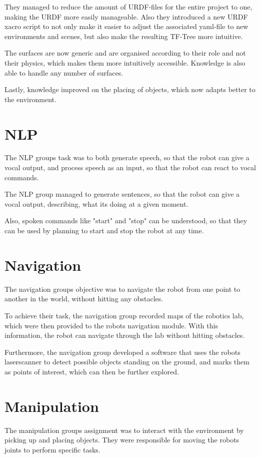\documentclass[main.tex]{subfiles}
\begin{document}
		They managed to reduce the amount of URDF-files for the entire project to one, making the URDF more easily manageable.  Also they introduced a new URDF xacro script to not only make it easier to adjust the associated yaml-file to new environments and scenes, but also make the resulting TF-Tree more intuitive.
		
		The surfaces are now generic and are organised according to their role and not their physics, which makes them more intuitively accessible. Knowledge is also able to handle any number of surfaces.
		
		Lastly, knowledge improved on the placing of objects, which now adapts better to the environment. 		
		\section{NLP}
		The NLP groups task was to both generate speech, so that the robot can give a vocal output, and process speech as an input, so that the robot can react to vocal commands.
		
		The NLP group managed to generate sentences, so that the robot can give a vocal output, describing, what its doing at a given moment.
		
		Also, spoken commands like "start" and "stop" can be understood, so that they can be used by planning to start and stop the robot at any time.
		
		\section{Navigation}	  	
		The navigation groups objective was to navigate the robot from one point to another in the world, without hitting any obstacles.
		
		To achieve their task, the navigation group recorded maps of the robotics lab, which were then provided to the robots navigation module. With this information, the robot can navigate through the lab without hitting obstacles.
		
		Furthermore, the navigation group developed a software that uses the robots laserscanner to detect possible objects standing on the ground, and marks them as points of interest, which can then be further explored.

		\section{Manipulation}
		The manipulation groups assignment was to interact with the environment by picking up and placing objects. They were responsible for moving the robots joints to perform specific tasks.
		
\end{document}
